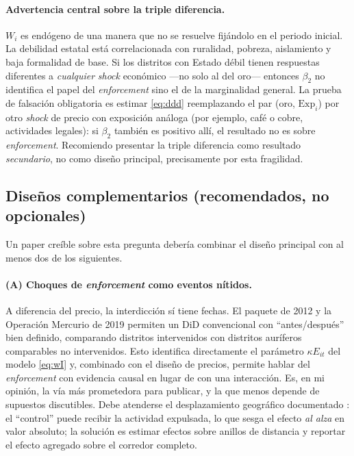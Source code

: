 \documentclass[11pt,a4paper]{article}
\newcommand{\Exp}{\mathrm{Exp}}
\begin{document}
\paragraph{Advertencia central sobre la triple diferencia.} $W_i$ es endógeno de una manera que no se resuelve fijándolo en el periodo inicial. La debilidad estatal está correlacionada con ruralidad, pobreza, aislamiento y baja formalidad de base. Si los distritos con Estado débil tienen respuestas diferentes a \emph{cualquier} \emph{shock} económico ---no solo al del oro--- entonces $\beta_2$ no identifica el papel del \emph{enforcement} sino el de la marginalidad general. La prueba de falsación obligatoria es estimar \eqref{eq:ddd} reemplazando el par (oro, $\Exp_i$) por otro \emph{shock} de precio con exposición análoga (por ejemplo, café o cobre, actividades legales): si $\beta_2$ también es positivo allí, el resultado no es sobre \emph{enforcement}. Recomiendo presentar la triple diferencia como resultado \emph{secundario}, no como diseño principal, precisamente por esta fragilidad.

\subsection{Diseños complementarios (recomendados, no opcionales)}

Un paper creíble sobre esta pregunta debería combinar el diseño principal con al menos dos de los siguientes.

\paragraph{(A) Choques de \emph{enforcement} como eventos nítidos.} A diferencia del precio, la interdicción sí tiene fechas. El paquete de 2012 y la Operación Mercurio de 2019 permiten un DiD convencional con ``antes/después'' bien definido, comparando distritos intervenidos con distritos auríferos comparables no intervenidos. Esto identifica directamente el parámetro $\kappa E_{it}$ del modelo \eqref{eq:wI} y, combinado con el diseño de precios, permite hablar del \emph{enforcement} con evidencia causal en lugar de con una interacción. Es, en mi opinión, la vía más prometedora para publicar, y la que menos depende de supuestos discutibles. Debe atenderse el desplazamiento geográfico documentado \citep{maap2019}: el ``control'' puede recibir la actividad expulsada, lo que sesga el efecto \emph{al alza} en valor absoluto; la solución es estimar efectos sobre anillos de distancia y reportar el efecto agregado sobre el corredor completo.
\end{document}
